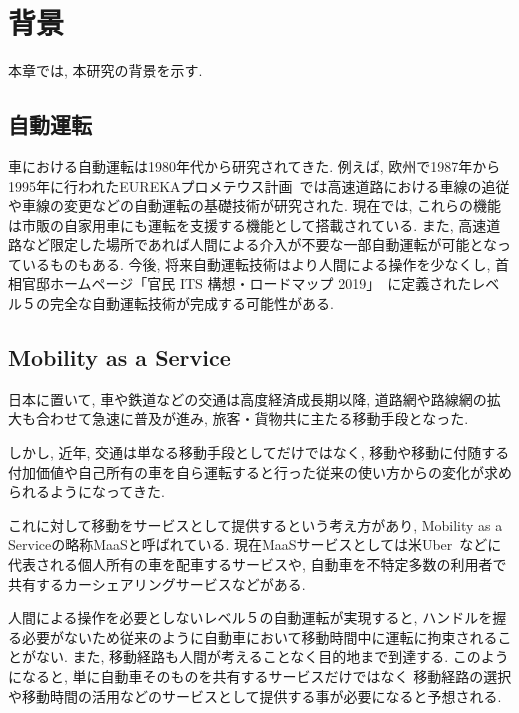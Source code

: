 \chapter{背景}
\label{background}



本章では, 本研究の背景を示す.

\section{自動運転}

車における自動運転は1980年代から研究されてきた.
例えば, 欧州で1987年から1995年に行われたEUREKAプロメテウス計画~\cite{Eureka}では高速道路における車線の追従や車線の変更などの自動運転の基礎技術が研究された.
現在では, これらの機能は市販の自家用車にも運転を支援する機能として搭載されている. また, 高速道路など限定した場所であれば人間による介入が不要な一部自動運転が可能となっているものもある.
今後, 将来自動運転技術はより人間による操作を少なくし, 首相官邸ホームページ「官民 ITS 構想・ロードマップ 2019」~\cite{AutoMobilityLevel5}に定義されたレベル５の完全な自動運転技術が完成する可能性がある.



\section{Mobility as a Service \cite{MaaS}}

日本に置いて, 車や鉄道などの交通は高度経済成長期以降, 道路網や路線網の拡大も合わせて急速に普及が進み, 旅客・貨物共に主たる移動手段となった. 

しかし, 近年, 交通は単なる移動手段としてだけではなく, 移動や移動に付随する付加価値や自己所有の車を自ら運転すると行った従来の使い方からの変化が求められるようになってきた.

これに対して移動をサービスとして提供するという考え方があり, Mobility as a Service\cite{MaaS}の略称MaaS\cite{MaaS}と呼ばれている. 現在MaaSサービスとしては米Uber~\cite{Uber}などに代表される個人所有の車を配車するサービスや, 自動車を不特定多数の利用者で共有するカーシェアリングサービスなどがある.

人間による操作を必要としないレベル５の自動運転が実現すると, ハンドルを握る必要がないため従来のように自動車において移動時間中に運転に拘束されることがない.
また, 移動経路も人間が考えることなく目的地まで到達する. このようになると, 単に自動車そのものを共有するサービスだけではなく
移動経路の選択や移動時間の活用などのサービスとして提供する事が必要になると予想される.

